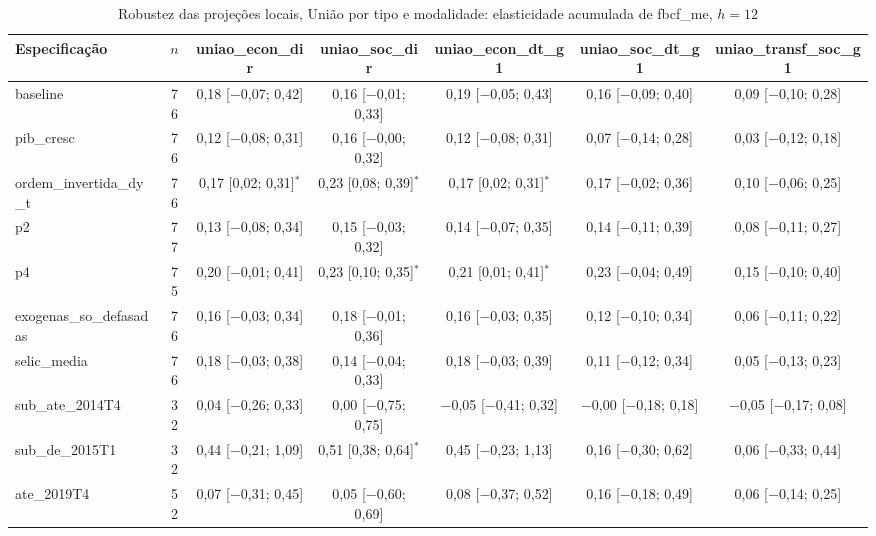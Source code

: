 \begin{table}[htbp]
\centering
\caption{Robustez das proje\c{c}\~oes locais, Uni\~ao por tipo e modalidade: elasticidade acumulada de fbcf\_me, $h = 12$}
\label{tab:a6_lp_rob_uniao}
\scriptsize
\begin{adjustbox}{max width=\linewidth}
\begin{tabular}{lcccccc}
\toprule
Especifica\c{c}\~ao & $n$ & uniao\_econ\_dir & uniao\_soc\_dir & uniao\_econ\_dt\_g1 & uniao\_soc\_dt\_g1 & uniao\_transf\_soc\_g1 \\
\midrule
baseline & 76 & 0{,}18 [$-$0{,}07; 0{,}42] & 0{,}16 [$-$0{,}01; 0{,}33] & 0{,}19 [$-$0{,}05; 0{,}43] & 0{,}16 [$-$0{,}09; 0{,}40] & 0{,}09 [$-$0{,}10; 0{,}28] \\
pib\_cresc & 76 & 0{,}12 [$-$0{,}08; 0{,}31] & 0{,}16 [$-$0{,}00; 0{,}32] & 0{,}12 [$-$0{,}08; 0{,}31] & 0{,}07 [$-$0{,}14; 0{,}28] & 0{,}03 [$-$0{,}12; 0{,}18] \\
ordem\_invertida\_dy\_t & 76 & 0{,}17 [0{,}02; 0{,}31]$^{*}$ & 0{,}23 [0{,}08; 0{,}39]$^{*}$ & 0{,}17 [0{,}02; 0{,}31]$^{*}$ & 0{,}17 [$-$0{,}02; 0{,}36] & 0{,}10 [$-$0{,}06; 0{,}25] \\
p2 & 77 & 0{,}13 [$-$0{,}08; 0{,}34] & 0{,}15 [$-$0{,}03; 0{,}32] & 0{,}14 [$-$0{,}07; 0{,}35] & 0{,}14 [$-$0{,}11; 0{,}39] & 0{,}08 [$-$0{,}11; 0{,}27] \\
p4 & 75 & 0{,}20 [$-$0{,}01; 0{,}41] & 0{,}23 [0{,}10; 0{,}35]$^{*}$ & 0{,}21 [0{,}01; 0{,}41]$^{*}$ & 0{,}23 [$-$0{,}04; 0{,}49] & 0{,}15 [$-$0{,}10; 0{,}40] \\
exogenas\_so\_defasadas & 76 & 0{,}16 [$-$0{,}03; 0{,}34] & 0{,}18 [$-$0{,}01; 0{,}36] & 0{,}16 [$-$0{,}03; 0{,}35] & 0{,}12 [$-$0{,}10; 0{,}34] & 0{,}06 [$-$0{,}11; 0{,}22] \\
selic\_media & 76 & 0{,}18 [$-$0{,}03; 0{,}38] & 0{,}14 [$-$0{,}04; 0{,}33] & 0{,}18 [$-$0{,}03; 0{,}39] & 0{,}11 [$-$0{,}12; 0{,}34] & 0{,}05 [$-$0{,}13; 0{,}23] \\
sub\_ate\_2014T4 & 32 & 0{,}04 [$-$0{,}26; 0{,}33] & 0{,}00 [$-$0{,}75; 0{,}75] & $-$0{,}05 [$-$0{,}41; 0{,}32] & $-$0{,}00 [$-$0{,}18; 0{,}18] & $-$0{,}05 [$-$0{,}17; 0{,}08] \\
sub\_de\_2015T1 & 32 & 0{,}44 [$-$0{,}21; 1{,}09] & 0{,}51 [0{,}38; 0{,}64]$^{*}$ & 0{,}45 [$-$0{,}23; 1{,}13] & 0{,}16 [$-$0{,}30; 0{,}62] & 0{,}06 [$-$0{,}33; 0{,}44] \\
ate\_2019T4 & 52 & 0{,}07 [$-$0{,}31; 0{,}45] & 0{,}05 [$-$0{,}60; 0{,}69] & 0{,}08 [$-$0{,}37; 0{,}52] & 0{,}16 [$-$0{,}18; 0{,}49] & 0{,}06 [$-$0{,}14; 0{,}25] \\

\end{tabular}
\end{adjustbox}
\end{table}
